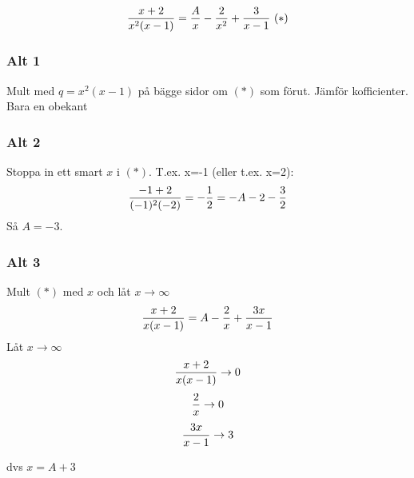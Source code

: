 \documentclass{article}
\begin{document}
\subsubsection{}
$$ \frac{x+2}{x^2(x-1)} = \frac{A}{x} - \frac{2}{x^2} + \frac{3}{x-1}\ (*) $$

\subsubsection{Alt 1}
Mult med $q=x^2(x-1)$ på bägge sidor om $(*)$ som förut. Jämför kofficienter. Bara en obekant

\subsubsection{Alt 2}
Stoppa in ett smart $x$ i $(*)$. T.ex. x=-1 (eller t.ex. x=2):
$$ \frac{-1+2}{(-1)^2(-2)} = -\frac{1}{2}  = -A-2-\frac{3}{2} $$
Så $A = -3$.

\subsubsection{Alt 3}
Mult $(*)$ med $x$ och låt $x\to \infty$
$$ \frac{x+2}{x(x-1)} = A-\frac{2}{x} + \frac{3x}{x-1} $$
Låt $x\to \infty$
$$ \frac{x+2}{x(x-1)}\to 0 $$
$$\frac{2}{x} \to 0$$
$$\frac{3x}{x-1} \to 3 $$

dvs $x=A+3$
\end{document}
